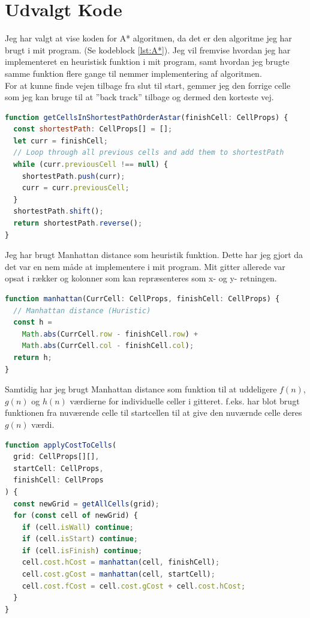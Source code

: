 \documentclass[12pt]{article}
\begin{document}
\section{Udvalgt Kode}
Jeg har valgt at vise koden for A* algoritmen, da det er den algoritme jeg har brugt i mit program.
(Se kodeblock \ref{lst:A*}). Jeg vil fremvise hvordan jeg har implementeret en heuristisk funktion i mit program, samt hvordan jeg brugte samme funktion flere gange til nemmer implementering af algoritmen. \\
For at kunne finde vejen tilbage fra slut til start, gemmer jeg den forrige celle som jeg kan bruge til at ”back track” tilbage og dermed den korteste vej.

\begin{lstlisting}[language=JavaScript, caption=Find den korteste vej fra start til slut (A* algoritme)]
function getCellsInShortestPathOrderAstar(finishCell: CellProps) {
  const shortestPath: CellProps[] = [];
  let curr = finishCell;
  // Loop through all previous cells and add them to shortestPath
  while (curr.previousCell !== null) {
    shortestPath.push(curr);
    curr = curr.previousCell;
  }
  shortestPath.shift();
  return shortestPath.reverse();
}
\end{lstlisting}
Jeg har brugt Manhattan distance som heuristik funktion. 
Dette har jeg gjort da det var en nem måde at implementere i mit program. 
Mit gitter allerede var opsat i rækker og kolonner som kan repræsenteres som x- og y- retningen.
\begin{lstlisting}[language=JavaScript, caption=Heuristic function for A* algoritmen]
function manhattan(CurrCell: CellProps, finishCell: CellProps) {
  // Manhattan distance (Huristic)
  const h =
    Math.abs(CurrCell.row - finishCell.row) +
    Math.abs(CurrCell.col - finishCell.col);
  return h;
}
\end{lstlisting}
Samtidig har jeg brugt Manhattan distance som funktion til at uddeligere $f(n)$,$g(n)$ 
og $h(n)$ værdierne for individuelle celler i gitteret. f.eks. har blot brugt funktionen fra nuværende celle til startcellen til at give den nuværnde celle deres $g(n)$ værdi.  
\begin{lstlisting}[language=JavaScript, caption=Brug af Manhattan distance når cellerne skulle have deres $f(n)$ $g(n)$ og $h(n)$ værdier]
function applyCostToCells(
  grid: CellProps[][],
  startCell: CellProps,
  finishCell: CellProps
) {
  const newGrid = getAllCells(grid);
  for (const cell of newGrid) {
    if (cell.isWall) continue;
    if (cell.isStart) continue;
    if (cell.isFinish) continue;
    cell.cost.hCost = manhattan(cell, finishCell);
    cell.cost.gCost = manhattan(cell, startCell);
    cell.cost.fCost = cell.cost.gCost + cell.cost.hCost;
  }
}
\end{lstlisting}
\end{document}
